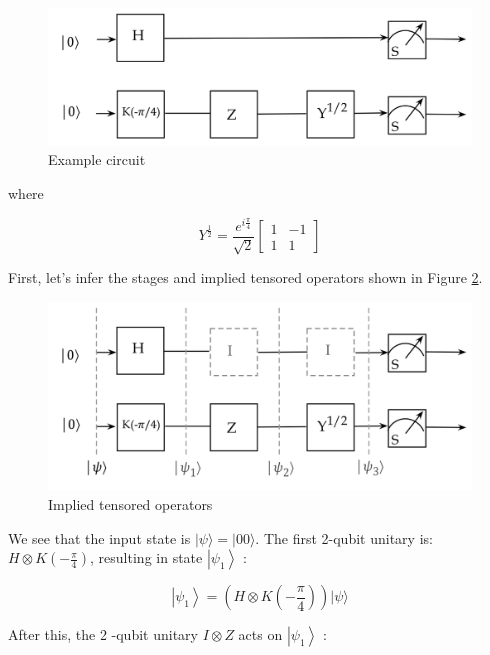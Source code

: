 \documentclass[main.tex]{subfiles}
\begin{document}
    \begin{figure}
        \centering
        \includegraphics[width=5in]{notes/figs/n08/15circuitexample1.png}
        \caption{Example circuit}
        \label{fig:15circuitexample1}
    \end{figure}
    
    where
    
    $$
    Y^{\frac{1}{2}}=\frac{e^{i \frac{\pi}{4}}}{\sqrt{2}}\left[\begin{array}{cc}
    1 & -1 \\
    1 & 1
    \end{array}\right]
    $$
    
    First, let's infer the stages and implied tensored operators shown in Figure \ref{fig:16circuitexample2}.
    
    \begin{figure}
        \centering
        \includegraphics[width=5in]{notes/figs/n08/16circuitexample2.png}
        \caption{Implied tensored operators}
        \label{fig:16circuitexample2}
    \end{figure}
    
    We see that the input state is $|\psi\rangle=|00\rangle$. The first 2-qubit unitary is: $H \otimes K\left(-\frac{\pi}{4}\right)$, resulting in state $\left|\psi_{1}\right\rangle$ :
    
    $$
    \left|\psi_{1}\right\rangle=\left(H \otimes K\left(-\frac{\pi}{4}\right)\right)|\psi\rangle
    $$
    
    After this, the 2 -qubit unitary $I \otimes Z$ acts on $\left|\psi_{1}\right\rangle$ :
    
\end{document}
